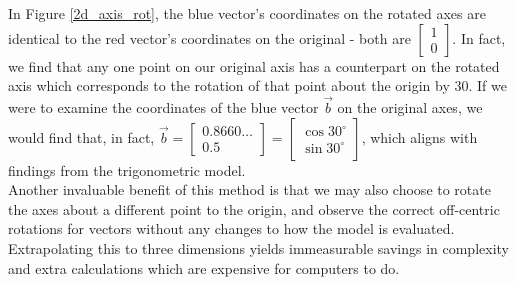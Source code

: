 \documentclass[12pt, a4paper]{article}
\begin{document}
In Figure \ref{2d_axis_rot}, the blue vector's coordinates on the rotated axes
are identical to the red vector's coordinates on the original - both are
$\begin{bmatrix}1 \\ 0\end{bmatrix}$. In fact, we find that any one point on our
original axis has a counterpart on the rotated axis which corresponds to the
rotation of that point about the origin by $30$\textdegree. If we were to
examine the coordinates of the blue vector $\vec{b}$ on the original axes, we
would find that, in fact, $
    \vec{b} 
    =
    \begin{bmatrix}
        0.8660 \hdots \\ 0.5
    \end{bmatrix}
    =
    \begin{bmatrix}
        \cos 30^\circ \\
        \sin 30^\circ
    \end{bmatrix}
$, which aligns with findings from the trigonometric model. \\

Another invaluable benefit of this method is that we may also choose to rotate
the axes about a different point to the origin, and observe the correct
off-centric rotations for vectors without any changes to how the model is
evaluated. Extrapolating this to three dimensions yields immeasurable savings in
complexity and extra calculations which are expensive for computers to do. \\
\end{document}
